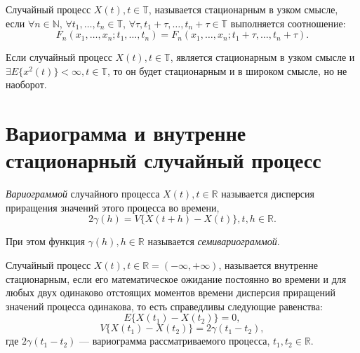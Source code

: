 \begin{Definition}
	Случайный процесс $ X(t), t \in \mathbb{T} $, называется стационарным в узком смысле, если $ \forall n \in \mathbb{N} $, $ \forall t_1, \dots, t_n \in \mathbb{T} $, $ \forall \tau, t_1 + \tau, \dots, t_n + \tau \in \mathbb{T} $ выполняется соотношение:
	\begin{equation*}
		F_n(x_1, \dots, x_n; t_1, \dots, t_n) = F_n(x_1, \dots, x_n; t_1 + \tau , \dots, t_n + \tau).
	\end{equation*}
\end{Definition}

\begin{Remark}
	Если случайный процесс $ X(t), t \in \mathbb{T} $, является стационарным в узком смысле и $ \exists E \{ x^2(t) \} < \infty, t \in \mathbb{T} $, то он будет стационарным и в широком смысле, но не наоборот.
\end{Remark}

\section{Вариограмма и внутренне стационарный случайный процесс}
\label{sec:variogramAndInnerStationarity}

\begin{Definition}
    \textit{Вариограммой} случайного процесса $ X(t), t \in \mathbb{R} $ называется дисперсия приращения значений этого процесса во времени,
	\begin{equation}
	    2 \gamma (h) = V \{ X(t+h) - X(t) \}, t, h \in \mathbb{R}.
	\end{equation}
	
	При этом функция $ \gamma (h), h \in \mathbb{R} $ называется \textit{семивариограммой}.
\end{Definition}

\begin{Definition}
	Случайный процесс $ X(t), t \in \mathbb{R} = (-\infty, +\infty) $, называется внутренне стационарным, если его математическое ожидание постоянно во времени и для любых двух одинаково отстоящих моментов времени дисперсия приращений значений процесса одинакова, то есть справедливы следующие равенства:
	\begin{equation}
		E \{ X(t_1) - X(t_2) \} = 0,
	\end{equation}
	\begin{equation}
	    V \{ X(t_1) - X(t_2) \} = 2 \gamma (t_1 - t_2),
	\end{equation}
	где $ 2 \gamma(t_1 - t_2) $ --- вариограмма рассматриваемого процесса, $ t_1, t_2 \in \mathbb{R} $.
\end{Definition}

